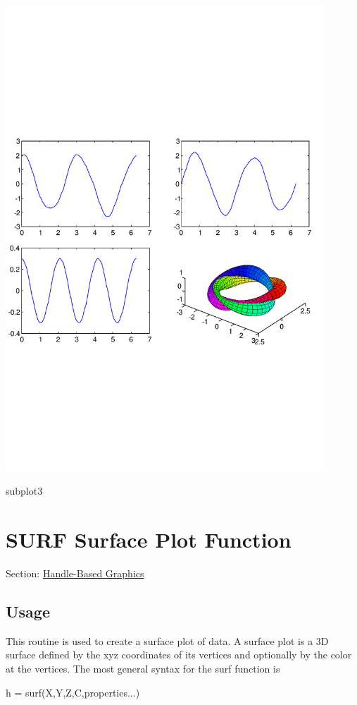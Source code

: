  
\begin{DoxyImage}
\includegraphics[width=12cm]{subplot3}
\caption{subplot3}
\end{DoxyImage}
 \hypertarget{handle_surf}{}\section{S\-U\-R\-F Surface Plot Function}\label{handle_surf}
Section\-: \hyperlink{sec_handle}{Handle-\/\-Based Graphics} \hypertarget{vtkwidgets_vtkxyplotwidget_Usage}{}\subsection{Usage}\label{vtkwidgets_vtkxyplotwidget_Usage}
This routine is used to create a surface plot of data. A surface plot is a 3\-D surface defined by the xyz coordinates of its vertices and optionally by the color at the vertices. The most general syntax for the {\ttfamily surf} function is \begin{DoxyVerb}  h = surf(X,Y,Z,C,properties...)
\end{DoxyVerb}
